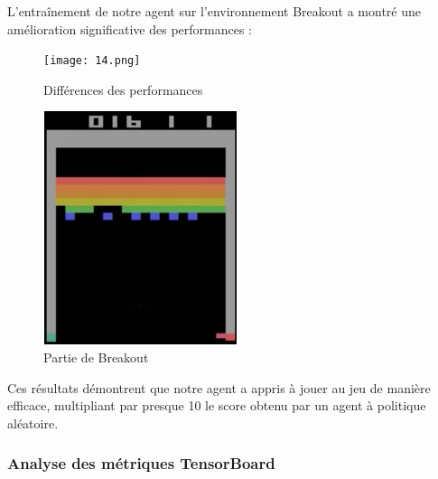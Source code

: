 \documentclass{article}
\begin{document}
\quad L'entraînement de notre agent sur l'environnement Breakout a montré une amélioration significative des performances :
\begin{figure}[ht]
    \centering
    \begin{minipage}{0.6\textwidth}
        \centering
        \texttt{[image: 14.png]}
        \caption{Différences des performances}
    \end{minipage}
    \hspace{0.05\textwidth}
    \begin{minipage}{0.2\textwidth}
        \centering
        \includegraphics[width=\textwidth]{6.png}
        \caption{Partie de Breakout}
    \end{minipage}
\end{figure}

Ces résultats démontrent que notre agent a appris à jouer au jeu de manière efficace, multipliant par presque 10 le score obtenu par un agent à politique aléatoire.

    \subsubsection{Analyse des métriques TensorBoard}
    
\end{document}
